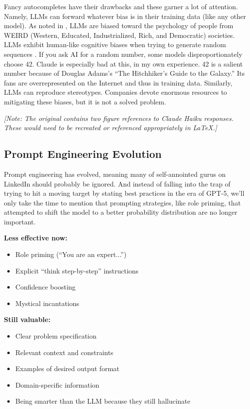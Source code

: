 Fancy autocompletes have their drawbacks and these garner a lot of attention. Namely, LLMs can forward whatever bias is in their training data (like any other model). As noted in \cite{atari2023humans}, LLMs are biased toward the psychology of people from WEIRD (Western, Educated, Industrialized, Rich, and Democratic) societies. LLMs exhibit human-like cognitive biases when trying to generate random sequences \cite{van2024random}. If you ask AI for a random number, some models disproportionately choose 42. Claude is especially bad at this, in my own experience. 42 is a salient number because of Douglas Adams's ``The Hitchhiker's Guide to the Galaxy.'' Its fans are overrepresented on the Internet and thus in training data. Similarly, LLMs can reproduce stereotypes. Companies devote enormous resources to mitigating these biases, but it is not a solved problem.

\textit{[Note: The original contains two figure references to Claude Haiku responses. These would need to be recreated or referenced appropriately in LaTeX.]}

\subsection{Prompt Engineering Evolution}

Prompt engineering has evolved, meaning many of self-annointed gurus on LinkedIn should probably be ignored. And instead of falling into the trap of trying to hit a moving target by stating best practices in the era of GPT-5, we'll only take the time to mention that prompting strategies, like role priming, that attempted to shift the model to a better probability distribution are no longer important.

\textbf{Less effective now:}
\begin{itemize}
\item Role priming (``You are an expert...'')
\item Explicit ``think step-by-step'' instructions
\item Confidence boosting
\item Mystical incantations
\end{itemize}

\textbf{Still valuable:}
\begin{itemize}
\item Clear problem specification
\item Relevant context and constraints
\item Examples of desired output format
\item Domain-specific information
\item Being smarter than the LLM because they still hallucinate
\end{itemize}

